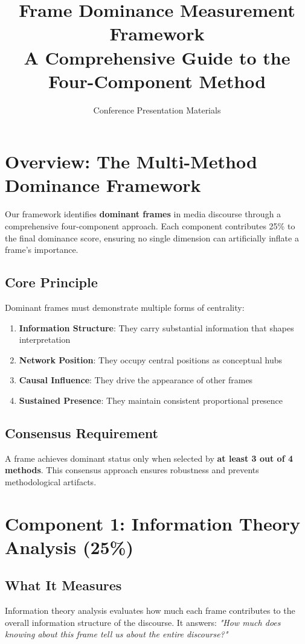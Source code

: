 \documentclass[11pt]{article}
\title{\textbf{Frame Dominance Measurement Framework}\\
\large A Comprehensive Guide to the Four-Component Method}
\author{Conference Presentation Materials}
\date{}
\begin{document}
\maketitle

\section{Overview: The Multi-Method Dominance Framework}

Our framework identifies \textbf{dominant frames} in media discourse through a comprehensive four-component approach. Each component contributes 25\% to the final dominance score, ensuring no single dimension can artificially inflate a frame's importance.

\subsection{Core Principle}
Dominant frames must demonstrate multiple forms of centrality:
\begin{enumerate}
    \item \textbf{Information Structure}: They carry substantial information that shapes interpretation
    \item \textbf{Network Position}: They occupy central positions as conceptual hubs
    \item \textbf{Causal Influence}: They drive the appearance of other frames
    \item \textbf{Sustained Presence}: They maintain consistent proportional presence
\end{enumerate}

\subsection{Consensus Requirement}
A frame achieves dominant status only when selected by \textbf{at least 3 out of 4 methods}. This consensus approach ensures robustness and prevents methodological artifacts.

\section{Component 1: Information Theory Analysis (25\%)}

\subsection{What It Measures}
Information theory analysis evaluates how much each frame contributes to the overall information structure of the discourse. It answers: \textit{"How much does knowing about this frame tell us about the entire discourse?"}
\end{document}
